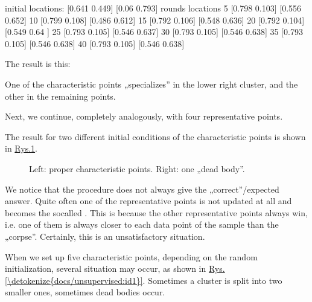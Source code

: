 \documentclass[a4paper,12pt,polish]{jupyterBook}
\let\sphinxpxdimen\pdfpxdimen\else\newdimen\sphinxpxdimen
\begin{document}
\begin{sphinxVerbatimOutput}

\begin{sphinxVerbatim}[commandchars=\\\{\}]
initial locations:
[0.641 0.449] [0.06  0.793]
rounds  locations
5      [0.798 0.103] [0.556 0.652]
10      [0.799 0.108] [0.486 0.612]
15      [0.792 0.106] [0.548 0.636]
20      [0.792 0.104] [0.549 0.64 ]
25      [0.793 0.105] [0.546 0.637]
30      [0.793 0.105] [0.546 0.638]
35      [0.793 0.105] [0.546 0.638]
40      [0.793 0.105] [0.546 0.638]
\end{sphinxVerbatim}
\end{sphinxVerbatimOutput}

\sphinxAtStartPar
The result is this:
\begin{sphinxVerbatimOutput}

\noindent{}
\end{sphinxVerbatimOutput}

\sphinxAtStartPar
One of the characteristic points „specializes” in the lower right cluster, and the other in the remaining points.

\sphinxAtStartPar
Next, we continue, completely analogously, with four representative points.

\sphinxAtStartPar
The result for two different initial conditions of the characteristic points is
shown in \hyperref[\detokenize{docs/unsupervised:p-fig}]{Rys.\@ \ref{\detokenize{docs/unsupervised:p-fig}}}.

\begin{figure}[htbp]
\centering
\capstart

\noindent\sphinxincludegraphics[width=500\sphinxpxdimen]{{cl4_2}.png}
\caption{Left: proper characteristic points. Right: one „dead body”.}\label{\detokenize{docs/unsupervised:p-fig}}\end{figure}

\sphinxAtStartPar
We notice that the procedure does not always give the „correct”/expected answer. Quite often one of the representative points is not updated at all and becomes the so\sphinxhyphen{}called . This is because the other representative points always win, i.e. one of them is always closer to each data point of the sample than the „corpse”. Certainly, this is an unsatisfactory situation.

\sphinxAtStartPar
When we set up five characteristic points, depending on the random initialization, several situation may occur, as shown in \hyperref[\detokenize{docs/unsupervised:id1}]{Rys.\@ \ref{\detokenize{docs/unsupervised:id1}}}. Sometimes a cluster is split into two smaller ones, sometimes dead bodies occur.
\end{document}
